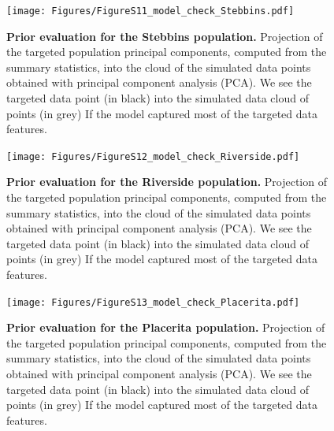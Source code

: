 \documentclass[a4paper, 12pt]{article}
\begin{document}
\begin{figure}[ht]
  \centering
  \texttt{[image: Figures/FigureS11\_model\_check\_Stebbins.pdf]}
  \small\caption{\textbf{Prior evaluation for the Stebbins population.} Projection of the targeted population principal components, computed from the summary statistics, into the cloud of the simulated data points obtained with principal component analysis (PCA). We see the targeted data point (in black) into the simulated data cloud of points (in grey) If the model captured most of the targeted data features.}
  \label{fig:supple_model_check_stebbins}
\end{figure}

\begin{figure}[ht]
  \centering
  \texttt{[image: Figures/FigureS12\_model\_check\_Riverside.pdf]}
  \small\caption{\textbf{Prior evaluation for the Riverside population.} Projection of the targeted population principal components, computed from the summary statistics, into the cloud of the simulated data points obtained with principal component analysis (PCA). We see the targeted data point (in black) into the simulated data cloud of points (in grey) If the model captured most of the targeted data features.}
  \label{fig:supple_model_check_riverside}
\end{figure}

\begin{figure}[ht]
  \centering
  \texttt{[image: Figures/FigureS13\_model\_check\_Placerita.pdf]}
  \small\caption{\textbf{Prior evaluation for the Placerita population.} Projection of the targeted population principal components, computed from the summary statistics, into the cloud of the simulated data points obtained with principal component analysis (PCA). We see the targeted data point (in black) into the simulated data cloud of points (in grey) If the model captured most of the targeted data features.}
  \label{fig:supple_model_check_placerita}
\end{figure}
\end{document}
